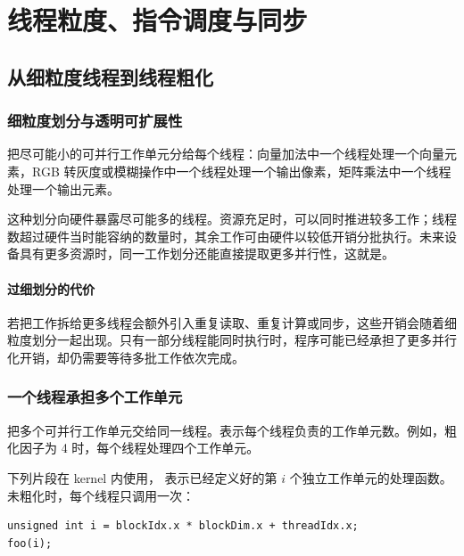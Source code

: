 \section{线程粒度、指令调度与同步}
\subsection{从细粒度线程到线程粗化}
\subsubsection{细粒度划分与透明可扩展性}
把尽可能小的可并行工作单元分给每个线程：向量加法中一个线程处理一个向量元素，RGB 转灰度或模糊操作中一个线程处理一个输出像素，矩阵乘法中一个线程处理一个输出元素。

这种划分向硬件暴露尽可能多的线程。资源充足时，可以同时推进较多工作；线程数超过硬件当时能容纳的数量时，其余工作可由硬件以较低开销分批执行。未来设备具有更多资源时，同一工作划分还能直接提取更多并行性，这就是。

\paragraph{过细划分的代价}
若把工作拆给更多线程会额外引入重复读取、重复计算或同步，这些开销会随着细粒度划分一起出现。只有一部分线程能同时执行时，程序可能已经承担了更多并行化开销，却仍需要等待多批工作依次完成。

\subsubsection{一个线程承担多个工作单元}
把多个可并行工作单元交给同一线程。表示每个线程负责的工作单元数。例如，粗化因子为 4 时，每个线程处理四个工作单元。

\par\noindent\begin{minipage}{\linewidth}
下列片段在 kernel 内使用， 表示已经定义好的第 $i$ 个独立工作单元的处理函数。未粗化时，每个线程只调用一次：

\begin{lstlisting}[caption={细粒度映射。}]
unsigned int i = blockIdx.x * blockDim.x + threadIdx.x;
foo(i);
\end{lstlisting}
\end{minipage}\par

